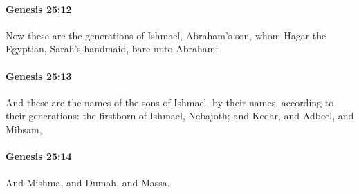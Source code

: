 		\paragraph{Genesis 25:12} %
			\label{GENESIS-25-12}

			Now these are the generations of Ishmael, Abraham's son, whom Hagar the Egyptian, Sarah's handmaid, bare unto Abraham:


		\paragraph{Genesis 25:13} %
			\label{GENESIS-25-13}

			And these are the names of the sons of Ishmael, by their names, according to their generations: the firstborn of Ishmael, Nebajoth; and Kedar, and Adbeel, and Mibsam,


		\paragraph{Genesis 25:14} %
			\label{GENESIS-25-14}

			And Mishma, and Dumah, and Massa,


